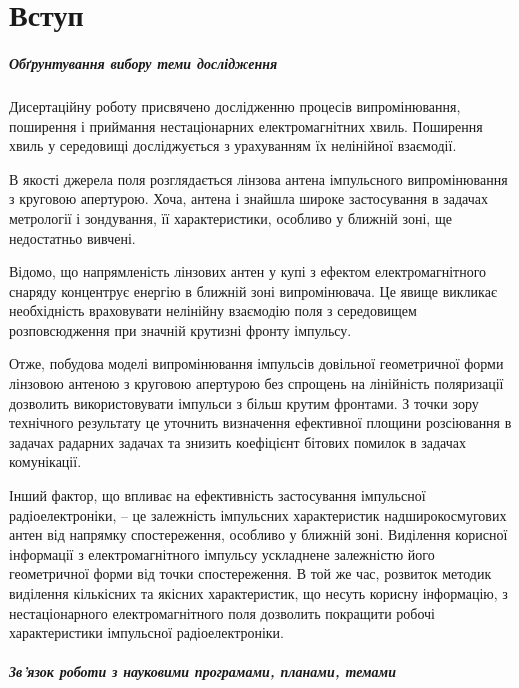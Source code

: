 \chapter*{Вступ}

\paragraph{Обґрунтування вибору теми дослідження}

Дисертаційну роботу присвячено дослідженню процесів випромінювання, поширення 
і приймання нестаціонарних електромагнітних хвиль. Поширення хвиль у 
середовищі досліджується з урахуванням їх нелінійної взаємодії. 

В якості джерела поля розглядається лінзова антена імпульсного випромінювання 
з круговою апертурою. Хоча, антена і знайшла широке застосування в задачах 
метрології і зондування, її характеристики, особливо у ближній зоні, 
ще недостатньо вивчені.

Відомо, що напрямленість лінзових антен у купі з ефектом електромагнітного 
снаряду концентрує енергію в ближній зоні випромінювача. Це явище викликає 
необхідність враховувати нелінійну взаємодію поля з середовищем розповсюдження
при значній крутизні фронту імпульсу.

Отже, побудова моделі випромінювання імпульсів довільної геометричної форми
лінзовою антеною з круговою апертурою без спрощень на лінійність поляризації
дозволить використовувати імпульси з більш крутим фронтами. З точки зору 
технічного результату це уточнить визначення ефективної площини розсіювання 
в задачах радарних задачах та знизить коефіцієнт бітових помилок в задачах 
комунікації.

Інший фактор, що впливає на ефективність застосування імпульсної 
радіоелектроніки, -- це залежність імпульсних характеристик надширокосмугових 
антен від напрямку спостереження, особливо у ближній зоні.
Виділення корисної інформації з електромагнітного імпульсу ускладнене 
залежністю його геометричної форми від точки спостереження. В той же час, 
розвиток методик виділення кількісних та якісних характеристик, що несуть 
корисну інформацію, з нестаціонарного електромагнітного поля дозволить 
покращити робочі характеристики імпульсної радіоелектроніки.

\paragraph{Зв'язок роботи з науковими програмами, планами, темами}

